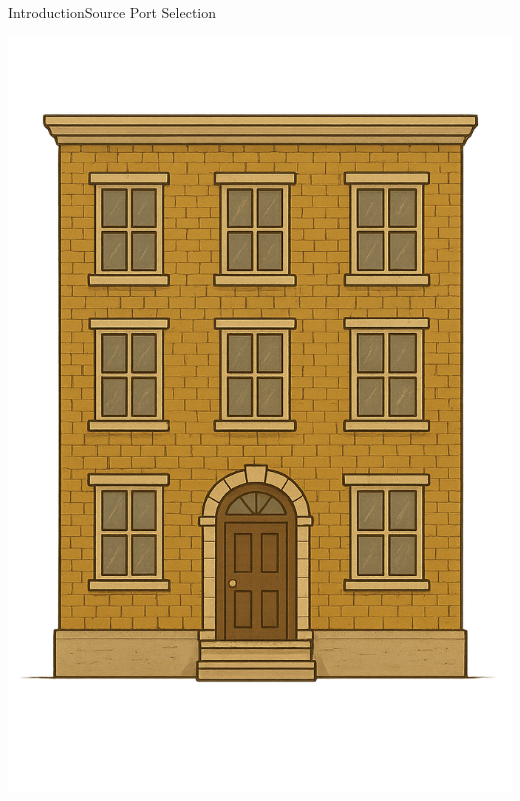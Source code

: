 \documentclass[aspectratio=169, hyperref={colorlinks=true, allcolors=SecondaryColor}, c]{beamer}
\begin{document}
\begin{frame}[fragile]{Introduction}{Source Port Selection}
\begin{itemize}
\begin{transformation}[0.2][0.6][0.2]
			\includegraphics[width=\textwidth]{./figures/apartment2.png}
		\end{transformation}
	\end{itemize}
\end{frame}
\end{document}
